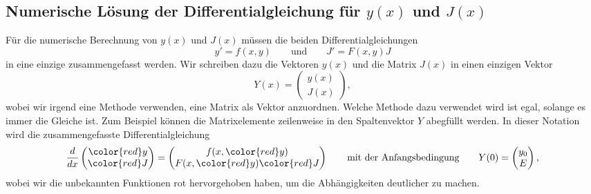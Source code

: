 \subsection{Numerische Lösung der Differentialgleichung für $y(x)$ und $J(x)$}
%
Für die numerische Berechnung von $y(x)$ und $J(x)$ müssen die
beiden Differentialgleichungen
\[
y' = f(x,y)
\qquad\text{und}\qquad
J' = F(x,y) J
\]
in eine einzige zusammengefasst werden.
Wir schreiben dazu die Vektoren $y(x)$ und die Matrix $J(x)$ in einen
einzigen Vektor
\[
Y(x)=\begin{pmatrix}y(x)\\J(x)\end{pmatrix},
\]
wobei wir irgend eine Methode verwenden, eine Matrix als Vektor
anzuordnen.
Welche Methode dazu verwendet wird ist egal, solange es immer die 
Gleiche ist.
Zum Beispiel können die Matrixelemente zeilenweise in den Spaltenvektor
$Y$ abegfüllt werden.
%
In dieser Notation wird die zusammengefasste Differentialgleichung
\begin{equation}
\frac{d}{dx}\begin{pmatrix}\color{red}y\\\color{red}J\end{pmatrix}
=
\begin{pmatrix}
f(x,{\color{red}y})\\
F(x,{\color{red}y}) {\color{red}J}
\end{pmatrix}
\qquad
\text{mit der Anfangsbedingung}
\qquad
Y(0)=
\begin{pmatrix}
y_0\\E
\end{pmatrix},
\end{equation}
wobei wir die unbekannten Funktionen rot hervorgehoben haben, um die
Abhängigkeiten deutlicher zu machen.

